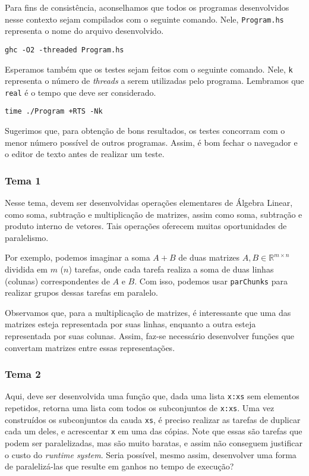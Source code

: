 \documentclass[a4paper]{article}
\begin{document}
Para fins de consistência, aconselhamos que todos os programas desenvolvidos
nesse contexto sejam compilados com o seguinte comando.
Nele, \texttt{Program.hs}
representa o nome do arquivo desenvolvido.

\begin{verbatim}
ghc -O2 -threaded Program.hs
\end{verbatim}

Esperamos também que os testes sejam feitos com o seguinte comando. Nele,
\texttt{k} representa o número de \emph{threads} a serem utilizadas pelo programa.
Lembramos que \texttt{real} é o tempo que deve ser considerado.

\begin{verbatim}
time ./Program +RTS -Nk
\end{verbatim}

Sugerimos que, para obtenção de bons resultados, os testes concorram com
o menor número possível de outros programas.
Assim, é bom fechar o navegador e o editor de texto antes de realizar um teste.

\subsubsection{Tema 1}

Nesse tema, devem ser desenvolvidas operações elementares de Álgebra Linear,
como soma, subtração e multiplicação de matrizes, assim como soma, subtração e
produto interno de vetores.
Tais operações oferecem muitas oportunidades de paralelismo.

Por exemplo, podemos imaginar a soma $A + B$ de duas matrizes $A, B \in \mathbb{R}^{m
  \times n}$ dividida em $m$ ($n$) tarefas, onde cada tarefa realiza a soma de duas
linhas (colunas) correspondentes de $A$ e $B$.
Com isso, podemos usar \texttt{parChunks} para realizar grupos dessas tarefas em paralelo.

Observamos que, para a multiplicação de matrizes, é interessante que uma das
matrizes esteja representada por suas linhas, enquanto a outra esteja
representada por suas colunas.
Assim, faz-se necessário desenvolver funções que convertam matrizes entre essas representações.

\subsubsection{Tema 2}

Aqui, deve ser desenvolvida uma função que, dada uma lista \texttt{x:xs} sem elementos
repetidos, retorna uma lista com todos os subconjuntos de \texttt{x:xs}.
Uma vez construídos os subconjuntos da cauda \texttt{xs}, é preciso realizar as
tarefas de duplicar cada
um deles, e acrescentar \texttt{x} em uma das cópias.
Note que essas são tarefas que podem ser paralelizadas, mas são muito baratas, e
assim não conseguem
justificar o custo do \emph{runtime system}.
Seria possível, mesmo assim, desenvolver uma forma de paralelizá-las que resulte
em ganhos no tempo de execução?
\end{document}
